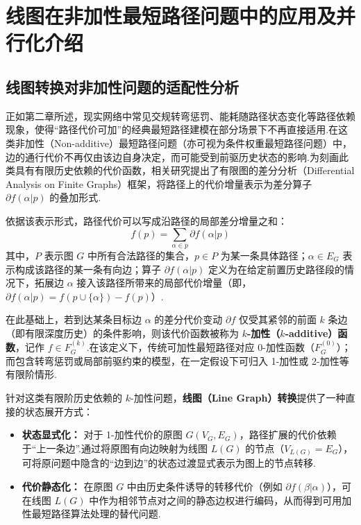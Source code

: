 
\chapter{线图在非加性最短路径问题中的应用及并行化介绍}

\raggedbottom


\section{线图转换对非加性问题的适配性分析}

正如第二章所述，现实网络中常见交规转弯惩罚、能耗随路径状态变化等路径依赖现象，使得“路径代价可加”的经典最短路径建模在部分场景下不再直接适用.在这类非加性（Non-additive）最短路径问题（亦可视为条件权重最短路径问题）中，边的通行代价不再仅由该边自身决定，而可能受到前驱历史状态的影响.为刻画此类具有有限历史依赖的代价函数，相关研究提出了有限图的差分分析（Differential Analysis on Finite Graphs）框架，将路径上的代价增量表示为差分算子 $\partial f(\alpha | p)$ 的叠加形式\cite{durand2024generalized}.

依据该表示形式，路径代价可以写成沿路径的局部差分增量之和：
\begin{equation}
    f(p) = \sum_{\alpha \in p} \partial f(\alpha | p)
\end{equation}
其中，$P$ 表示图 $G$ 中所有合法路径的集合，$p \in P$ 为某一条具体路径；$\alpha \in E_G$ 表示构成该路径的某一条有向边；算子 $\partial f(\alpha | p)$ 定义为在给定前置历史路径段的情况下，拓展边 $\alpha$ 接入该路径所带来的局部代价增量（即，$\partial f(\alpha|p) = f(p \cup \{\alpha\}) - f(p)$）.

在此基础上，若到达某条目标边 $\alpha$ 的差分代价变动 $\partial f$ 仅受其紧邻的前面 $k$ 条边（即有限深度历史）的条件影响，则该代价函数被称为 \textbf{$k$-加性（$k$-additive）函数}，记作 $f \in F^{(k)}_G$.在该定义下，传统可加性最短路径对应 0-加性函数（$F^{(0)}_G$）；而包含转弯惩罚或局部前驱约束的模型，在一定假设下可归入 1-加性或 2-加性等有限阶情形.

针对这类有限阶历史依赖的 $k$-加性问题，\textbf{线图（Line Graph）转换}提供了一种直接的状态展开方式：
\begin{itemize}
    \item \textbf{状态显式化：} 对于 1-加性代价的原图 $G(V_G, E_G)$，路径扩展的代价依赖于“上一条边”.通过将原图有向边映射为线图 $L(G)$ 的节点（$V_{L(G)} = E_G$），可将原问题中隐含的“边到边”的状态过渡显式表示为图上的节点转移.
    \item \textbf{代价静态化：} 在原图 $G$ 中由历史条件诱导的转移代价（例如 $\partial f(\beta | \alpha)$），可在线图 $L(G)$ 中作为相邻节点对之间的静态边权进行编码，从而得到可用加性最短路径算法处理的替代问题.
\end{itemize}

